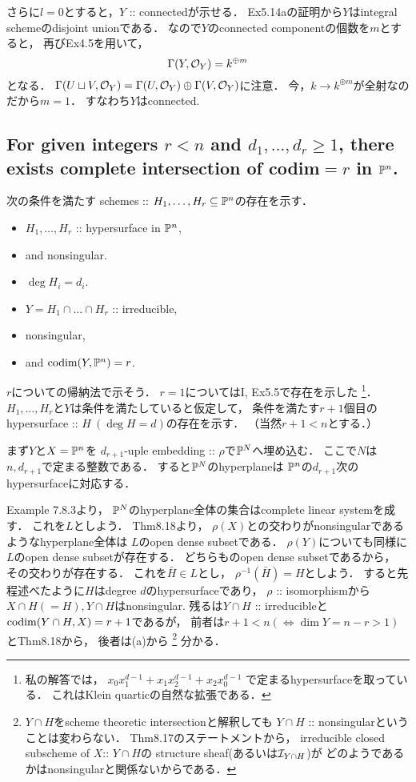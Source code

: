 \documentclass[a4paper]{jsarticle}
\begin{document}
    さらに$l=0$とすると，$Y$ :: connectedが示せる．
    Ex5.14aの証明から$Y$はintegral schemeのdisjoint unionである．
    なので$Y$のconnected componentの個数を$m$とすると，
    再びEx4.5を用いて，
    \[ \Gamma(Y, \mathcal{O}_Y)=k^{\oplus m} \]
    となる．
    $\Gamma(U \sqcup V, \mathcal{O}_Y)=\Gamma(U, \mathcal{O}_Y) \oplus \Gamma(V, \mathcal{O}_Y)$に注意．
    今，$k \to k^{\oplus m}$が全射なのだから$m=1$．
    すなわち$Y$はconnected.

    \subsection{For given integers $r<n$ and $d_1, \dots, d_r \geq 1$,
        there exists complete intersection of codim$=r$ in $\mathbb{P}^n$.}
    次の条件を満たす schemes :: $H_1,\dots,H_r \subseteq \mathbb{P}^n$の存在を示す．
    \begin{itemize}
        \item $H_1,\dots,H_r$ :: hypersurface in $\mathbb{P}^n$,
        \item and nonsingular.
        \item $\deg H_i=d_i$.
        \item $Y=H_1 \cap \dots \cap H_r$ :: irreducible,
        \item nonsingular,
        \item and $\operatorname{codim}(Y, \mathbb{P}^n)=r$.
    \end{itemize}

    $r$についての帰納法で示そう．
    $r=1$についてはI, Ex5.5で存在を示した
    \footnote
    {
        私の解答では，
        $x_0 x_1^{d-1}+x_1 x_2^{d-1}+x_2 x_0^{d-1}$
        で定まるhypersurfaceを取っている．
        これはKlein quarticの自然な拡張である．
    }．
    $H_1,\dots,H_r$と$Y$は条件を満たしていると仮定して，
    条件を満たす$r+1$個目のhypersurface :: $H \ (\deg H=d)$の存在を示す．
    （当然$r+1<n$とする．）

    まず$Y$と$X=\mathbb{P}^n$を
    $d_{r+1}$-uple embedding :: $\rho$で$\mathbb{P}^N$へ埋め込む．
    ここで$N$は$n, d_{r+1}$で定まる整数である．
    すると$\mathbb{P}^N$のhyperplaneは
    $\mathbb{P}^n$の$d_{r+1}$次のhypersurfaceに対応する．

    Example 7.8.3より，
    $\mathbb{P}^N$のhyperplane全体の集合はcomplete linear systemを成す．
    これを$L$としよう．
    Thm8.18より，
    $\rho(X)$との交わりがnonsingularであるようなhyperplane全体は
    $L$のopen dense subsetである．
    $\rho(Y)$についても同様に$L$のopen dense subsetが存在する．
    どちらものopen dense subsetであるから，
    その交わりが存在する．
    これを$\bar{H} \in L$とし，
    $\rho^{-1}(\bar{H})=H$としよう．
    すると先程述べたように$H$はdegree $d$のhypersurfaceであり，
    $\rho$ :: isomorphismから$X \cap H(=H), Y \cap H$はnonsingular.
    残るは$Y \cap H$ :: irreducibleと$\operatorname{codim}(Y \cap H, X)=r+1$であるが，
    前者は$r+1<n (\iff \dim Y=n-r>1)$とThm8.18から，
    後者は(a)から
    \footnote
    {
        $Y \cap H$をscheme theoretic intersectionと解釈しても
        $Y \cap H$ :: nonsingularということは変わらない．
        Thm8.17のステートメントから，
        irreducible closed subscheme of $X$:: $Y \cap H$の
        structure sheaf(あるいは$\mathcal{I}_{Y \cap H}$)が
        どのようであるかはnonsingularと関係ないからである．
    }
    分かる．
\end{document}
